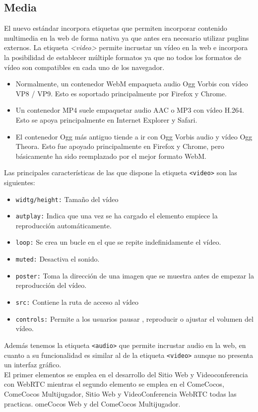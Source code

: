 \subsection{Media}
El nuevo estándar incorpora etiquetas que permiten incorporar contenido multimedia \cite{multimedia} en la web de forma nativa ya que antes era necesario utilizar puglins externos. La etiqueta \textit{<video>} permite incrustar un vídeo en la web e incorpora la posibilidad de establecer múltiple formatos ya que no todos los formatos de vídeo son compatibles en cada uno de los navegador.
\begin{itemize}
    \item Normalmente, un contenedor WebM empaqueta audio Ogg Vorbis con vídeo VP8 / VP9. Esto es soportado principalmente por Firefox y Chrome.
    \item Un contenedor MP4 suele empaquetar audio AAC o MP3 con vídeo H.264. Esto se apoya principalmente en Internet Explorer y Safari.
    \item El contenedor Ogg más antiguo tiende a ir con Ogg Vorbis audio y vídeo Ogg Theora. Esto fue apoyado principalmente en Firefox y Chrome, pero básicamente ha sido reemplazado por el mejor formato WebM. 
\end{itemize}
Las principales características de las que dispone la etiqueta \texttt{<video>} son las siguientes:
\begin{itemize}
  \item\texttt{widtg/height:} Tamaño del vídeo
  \item \texttt{autplay:} Indica que una vez se ha cargado el elemento empiece la reproducción automáticamente.
  \item \texttt{loop:} Se crea un bucle en el que se repite indefinidamente el vídeo.
  \item \texttt{muted:} Desactiva el sonido.
  \item \texttt{poster:} Toma la dirección de una imagen que se muestra antes de empezar la reproducción del vídeo.
  \item \texttt{src:} Contiene la ruta de acceso al vídeo
  \item \texttt{controls:} Permite a los usuarios pausar , reproducir o ajustar el volumen del vídeo.
\end{itemize}
Además tenemos la etiqueta \texttt{<audio>} que permite incrustar audio en la web, en cuanto a su funcionalidad es similar al de la etiqueta \texttt{<video>} aunque no presenta un interfaz gráfico.
\\El primer elementos se emplea en el desarrollo del Sitio Web y Videoconferencia con WebRTC mientras el segundo elemento se emplea en el ComeCocos, ComeCocos Multijugador, Sitio Web y VideoConferencia WebRTC todas las practicas.
omeCocos Web y del ComeCocos Multijugador.
